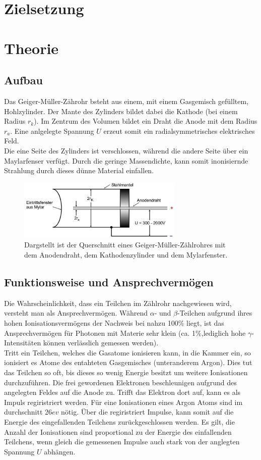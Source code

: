 \newpage
\section*{Zielsetzung}
\section{Theorie}
\subsection{Aufbau}
Das Geiger-Müller-Zährohr bsteht aus einem, mit einem Gasgemisch gefülltem,
Hohlzylinder. Der Mante des Zylinders bildet dabei die Kathode (bei einem Radius $r_k$).
Im Zentrum des Volumen bildet ein Draht die Anode mit dem Radius $r_a$. Eine anlgelegte
Spannung $U$ erzeut somit ein radialsymmetrisches elektrisches Feld.\\
Die eine Seite des Zylinders ist verschlossen, während die andere Seite über ein 
Maylarfenser verfügt. Durch die geringe Massendichte, kann somit inonisiernde Strahlung durch
dieses dünne Material einfallen.

\begin{figure}
    \centering
    \includegraphics[width=0.7\textwidth]{input/querschnitt.jpg}
    \caption{Dargstellt ist der Querschnitt eines Geiger-Müller-Zählrohres mit
    dem Anodendraht, dem Kathodenzylinder und dem Mylarfenster.\cite[220]{anleitung}}
\end{figure}
\subsection{Funktionsweise und Ansprechvermögen}
Die Wahrscheinlichkeit, dass ein Teilchen im Zählrohr nachgewiesen wird,
versteht man als Ansprechvermögen. Während $\alpha$- und $\beta$-Teilchen aufgrund
ihres hohen Ionisationsvermögens der Nachweis bei nahzu 100\% liegt, ist das 
Ansprechvermögen für Photonen mit Materie sehr klein (ca. 1\%,lediglich hohe $\gamma$-
Intensitäten können verlässlich gemessen werden).\\
Tritt ein Teilchen, welches die Gasatome ionisieren kann, in die Kammer ein, so
ionisiert es Atome des entahteten Gasgemisches (unteranderem Argon). Dies tut das Teilchen so oft,
bis dieses so wenig Energie besitzt um weitere Ionisationen durchzuführen. Die 
frei gewordenen Elektronen beschleunigen aufgrund des angelegten Feldes auf die Anode zu.
Trifft das Elektron dort auf, kann es als Impuls regiristriert werden.
Für eine Ionisationen eines Argon Atoms sind im durchschnitt $26\si{ev}$ nötig.
Über die regiristriert Impulse, kann somit auf die Energie des eingefallenden Teilchens
zurückgeschlossen werden. Es gilt, die Anzahl der Ionisationen sind proportional zu
der Energie des einfallenden Teilchens, wenn gleich die gemessenen Impulse 
auch stark von der anglegten Spannung $U$ abhängen.

